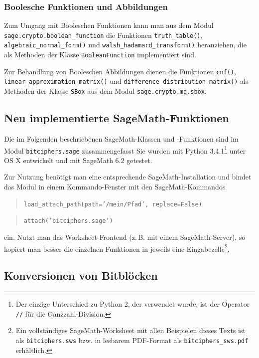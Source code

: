\begin{refsegment}
\subsubsection*{Boolesche Funktionen und Abbildungen}

Zum Umgang mit Booleschen
Funktionen
kann man aus dem Modul
\verb:sage.crypto.boolean_function: die Funktionen
\verb:truth_table():,
\verb:algebraic_normal_form(): und
\verb:walsh_hadamard_transform():
heranziehen, die als Methoden der Klasse \verb:BooleanFunction:
implementiert sind.

Zur Behandlung von Booleschen
Abbildungen
dienen die Funktionen
\verb:cnf():,
\verb:linear_approximation_matrix(): und
\verb:difference_distribution_matrix():
als Methoden der Klasse \verb:SBox: aus dem Modul \verb:sage.crypto.mq.sbox:.

\subsection{Neu implementierte SageMath-Funktionen}

Die im Folgenden beschriebenen SageMath-Klassen und -Funktionen sind
im Modul \verb:bitciphers.sage: zusammengefasst
Sie wurden mit Python 3.4.1\footnote{%
   Der einzige Unterschied zu Python 2, der verwendet wurde, ist der
   Operator {\tt //} für die Ganzzahl-Division.
} unter OS X entwickelt und mit SageMath 6.2 getestet.

Zur Nutzung benötigt man eine entsprechende SageMath-Installation
und bindet das Modul in einem Kommando-Fenster mit den SageMath-Kommandos
\begin{quote}
  {\tt load\_attach\_path(path='/mein/Pfad', replace=False)}
\end{quote}
\begin{quote}
   {\tt attach('bitciphers.sage')}
\end{quote}
ein. Nutzt man das Worksheet-Frontend (z.\,B. mit einem SageMath-Server),
so kopiert man besser die einzelnen Funktionen in jeweils eine
Eingabezelle\footnote{%
   Ein vollständiges SageMath-Worksheet mit allen Beispielen dieses
   Texts ist als {\tt bitciphers.sws} bzw. in lesbarem PDF-Format
   als {\tt bitciphers\_sws.pdf} erhältlich.
}.

\subsection{Konversionen von Bitblöcken}\label{ss-bool-conv}


\end{refsegment}
